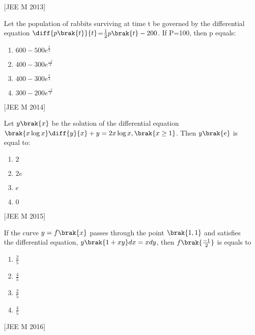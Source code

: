 \hfill
{[JEE M 2013]}


\item Let the population of rabbits surviving at time t be governed by the differential equation $\diff{p\brak{t}}{t}$=$\frac{1}{2}p\brak{t}-200$. If P=100, then p equals:

\begin{multicols}{2}
 \begin{enumerate}
    \item $ 600-500e^\frac{t}{2}$
    \item $ 400-300e^\frac{-t}{2}$
    \item $ 400-300e^\frac{t}{2}$
    \item $ 300-200e^\frac{-t}{2}$
 \end{enumerate}
\end{multicols}
\hfill
{[JEE M 2014]}
\item Let $y\brak{x}$ be the solution of the differential equation $\brak{x\log{x}}\diff{y}{x} + y = 2x \log{x},\brak{x\geq 1}$. Then $y\brak{e}$ is equal to:
\begin{multicols}{2}
 \begin{enumerate}
    \item $ 2 $
    \item $ 2e $
    \item $ e $
    \item $ 0 $
 \end{enumerate}
\end{multicols}
\hfill
{[JEE M 2015]}

\item If the curve $ y=f\brak{x}$ passes through the point $ \brak{1,1}$ and satisfies the differential equation, $ y\brak{1+xy}d{x}=xd{y}$, then $ f\brak{\frac{-1}{2}}$ is equals to 
\begin{multicols}{2}
 \begin{enumerate}
    \item $ \frac{2}{5}$



    \item $ \frac{4}{5}$


    \item $ \frac{2}{5}$



    \item $ \frac{4}{5}$


  \end{enumerate}
\end{multicols}
\hfill
{[JEE M 2016]}

